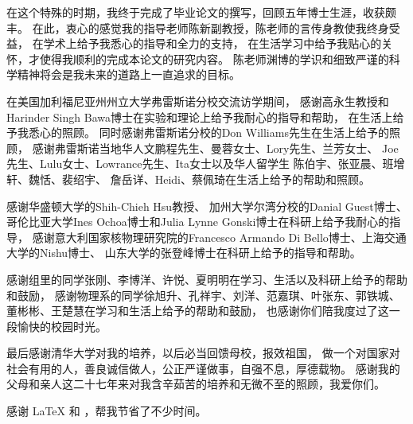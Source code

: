 
\begin{acknowledgements}

在这个特殊的时期，我终于完成了毕业论文的撰写，回顾五年博士生涯，收获颇丰。
在此，衷心的感觉我的指导老师陈新副教授，陈老师的言传身教使我终身受益，
在学术上给予我悉心的指导和全力的支持，
在生活学习中给予我贴心的关怀，才使得我顺利的完成本论文的研究内容。
陈老师渊博的学识和细致严谨的科学精神将会是我未来的道路上一直追求的目标。

在美国加利福尼亚州州立大学弗雷斯诺分校交流访学期间，
感谢高永生教授和Harinder Singh Bawa博士在实验和理论上给予我耐心的指导和帮助，
在生活上给予我悉心的照顾。
同时感谢弗雷斯诺分校的Don Williams先生在生活上给予的照顾，
感谢弗雷斯诺当地华人文鹏程先生、曼蓉女士、Lory先生、兰芳女士、
Joe先生、Lulu女士、Lowrance先生、Ita女士以及华人留学生
陈伯宇、张亚晨、班增轩、魏恬、裴绍宇、
詹岳详、Heidi、蔡佩琦在生活上给予的帮助和照顾。

感谢华盛顿大学的Shih-Chieh Hsu教授、
加州大学尔湾分校的Danial Guest博士、
哥伦比亚大学Ines Ochoa博士和Julia Lynne Gonski‎博士在科研上给予我耐心的指导，
感谢意大利国家核物理研究院的Francesco Armando Di Bello博士、上海交通大学的Nishu博士、
山东大学的张登峰博士在科研上给予的指导和帮助。

感谢组里的同学张刚、李博洋、许悦、夏明明在学习、生活以及科研上给予的帮助和鼓励，
感谢物理系的同学徐旭升、孔祥宇、刘洋、范嘉琪、叶张东、郭铁城、董彬彬、王楚慧在学习和生活上给予的帮助和鼓励，
也感谢你们陪我度过了这一段愉快的校园时光。

最后感谢清华大学对我的培养，以后必当回馈母校，报效祖国，
做一个对国家对社会有用的人，善良诚信做人，公正严谨做事，自强不息，厚德载物。
感谢我的父母和亲人这二十七年来对我含辛茹苦的培养和无微不至的照顾，我爱你们。

  感谢 \LaTeX{} 和 \thuthesis\cite{thuthesis}，帮我节省了不少时间。
\end{acknowledgements}
